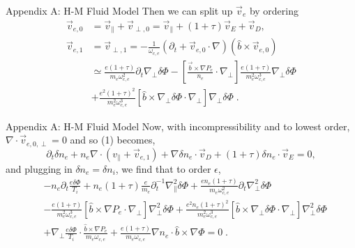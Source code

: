 \documentclass[aspectratio=43]{beamer}
\begin{document}
   \begin{frame}{Appendix A: H-M Fluid Model}
      \quad Then we can split up $\vec{v}_e$ by ordering
      \begin{equation}
      \begin{aligned}
         \vec{v}_{e,0} &= \vec{v}_{\parallel} + \vec{v}_{\perp,0} = \vec{v}_{\parallel} + \left(1 + \tau\right)\vec{v}_E + \vec{v}_D,  \\
         \vec{v}_{e,1} &= \vec{v}_{\perp,1} = -\frac{1}{\omega_{c,e}}(\partial_t+\vec{v}_{e,0}\cdot\nabla)(\hat{b}\times\vec{v}_{e,0}) \\
                       &\simeq \frac{e(1+\tau)}{m_e\omega_{c,e}^2}\partial_t\nabla_{\perp}\delta\Phi - [\frac{\vec{b}\times\nabla P_e}{n_e}\cdot\nabla_{\perp}]
                               \frac{e(1+\tau)}{m_e^2\omega_{c,e}^3}\nabla_{\perp}\delta\Phi \\
                       &+      \frac{e^2(1+\tau)^2}{m_e^2\omega_{c,e}^3}[\hat{b}\times\nabla_{\perp}\delta\Phi\cdot\nabla_{\perp}]\nabla_{\perp}\delta\Phi\;.
      \end{aligned}
      \end{equation}
   \end{frame}

   \begin{frame}{Appendix A: H-M Fluid Model}
      \vspace*{-5mm}
      \quad Now, with incompressibility and to lowest order, $\nabla\cdot\vec{v}_{e,0,\perp}=0$ and so (1) becomes,
      \begin{equation}
         \partial_t\delta n_e+n_e\nabla\cdot(v_{\parallel} + \vec{v}_{e,1}) + \nabla\delta n_e\cdot\vec{v}_D+(1+\tau)\delta n_e\cdot\vec{v}_E = 0,
      \end{equation}
      and plugging in $\delta n_e=\delta n_i$, we find that to order $\epsilon$,
      \vspace{-2mm}
      \begin{equation}
      \begin{aligned}
         &-n_e\partial_t\frac{e\delta\Phi}{T_i} + n_e(1+\tau)\frac{e}{m_e}\partial_t^{-1}\nabla_{\parallel}^2\delta\Phi
         + \frac{en_e(1+\tau)}{m_e\omega_{c,e}^2}\partial_t\nabla_{\perp}^2\delta\Phi \\
         &- \frac{e(1+\tau)}{m_e^2\omega_{c,e}^3}[\hat{b}\times\nabla P_e\cdot\nabla_{\perp}]\nabla_{\perp}^2\delta\Phi
         + \frac{e^2n_e(1+\tau)^2}{m_e^2\omega_{c,e}^3}[\hat{b}\times\nabla_{\perp}\delta\Phi\cdot\nabla_{\perp}]\nabla_{\perp}^2\delta\Phi \\
         &+ \nabla_{\perp}\frac{e\delta\Phi}{T_i}\cdot\frac{\hat{b}\times\nabla P_e}{m_e\omega_{c,e}} + \frac{e(1+\tau)}{m_e\omega_{c,e}}\nabla n_e\cdot\hat{b}\times\nabla\Phi = 0\;.
      \end{aligned}
      \end{equation}
   \end{frame}
\end{document}
